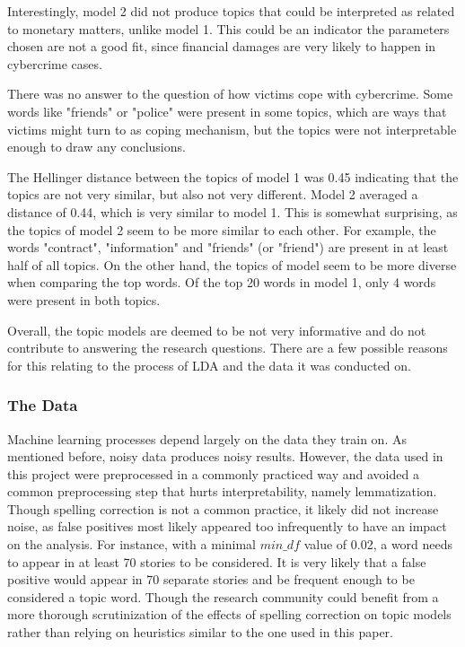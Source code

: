 Interestingly, model 2 did not produce topics that could be interpreted as related to monetary matters, unlike model 1. This could be an indicator the parameters chosen are not a good fit, since financial damages are very likely to happen in cybercrime cases.

There was no answer to the question of how victims cope with cybercrime. Some words like "friends" or "police" were present in some topics, which are ways that victims might turn to as coping mechanism, but the topics were not interpretable enough to draw any conclusions.

The Hellinger distance between the topics of model 1 was 0.45 indicating that the topics are not very similar, but also not very different. Model 2 averaged a distance of 0.44, which is very similar to model 1. This is somewhat surprising, as the topics of model 2 seem to be more similar to each other. For example, the words "contract", "information" and "friends" (or "friend") are present in at least half of all topics. On the other hand, the topics of model seem to be more diverse when comparing the top words. Of the top 20 words in model 1, only 4 words were present in both topics.

Overall, the topic models are deemed to be not very informative and do not contribute to answering the research questions. There are a few possible reasons for this relating to the process of LDA and the data it was conducted on.

\subsubsection*{The Data}

Machine learning processes depend largely on the data they train on. As mentioned before, noisy data produces noisy results. However, the data used in this project were preprocessed in a commonly practiced way and avoided a common preprocessing step that hurts interpretability, namely lemmatization.~\cite{schofield2016comparing} Though spelling correction is not a common practice, it likely did not increase noise, as false positives most likely appeared too infrequently to have an impact on the analysis. For instance, with a minimal $min\_df$ value of 0.02, a word needs to appear in at least 70 stories to be considered. It is very likely that a false positive would appear in 70 separate stories and be frequent enough to be considered a topic word. Though the research community could benefit from a more thorough scrutinization of the effects of spelling correction on topic models rather than relying on heuristics similar to the one used in this paper.

